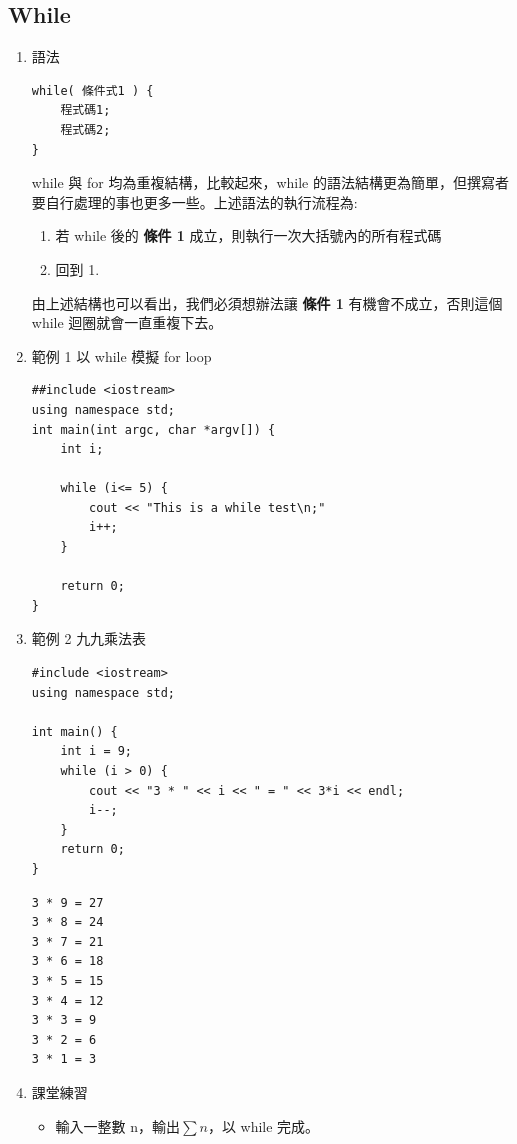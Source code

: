 \documentclass[a4paper,12pt]{article}
\begin{document}
\subsection{While}
\label{sec:org6940792}
\begin{enumerate}
\item 語法
\label{sec:org4c6519b}
\lstset{breaklines=true,language=cpp,label= ,caption= ,captionpos=b,firstnumber=1,numbers=left}
\begin{lstlisting}
while( 條件式1 ) {
    程式碼1;
    程式碼2;
}
\end{lstlisting}
while 與 for 均為重複結構，比較起來，while 的語法結構更為簡單，但撰寫者要自行處理的事也更多一些。上述語法的執行流程為:\\
\begin{enumerate}
\item 若 while 後的 \textbf{條件 1} 成立，則執行一次大括號內的所有程式碼\\
\item 回到 1.\\
\end{enumerate}
由上述結構也可以看出，我們必須想辦法讓 \textbf{條件 1} 有機會不成立，否則這個 while 迴圈就會一直重複下去。\\
\item 範例 1
\label{sec:org573c1be}
以 while 模擬 for loop\\
\lstset{breaklines=true,language=cpp,label= ,caption= ,captionpos=b,firstnumber=1,numbers=left}
\begin{lstlisting}
##include <iostream>
using namespace std;
int main(int argc, char *argv[]) {
    int i;

    while (i<= 5) {
        cout << "This is a while test\n;"
        i++;
    }

    return 0;
}
\end{lstlisting}

\item 範例 2
\label{sec:org74e1082}
九九乘法表\\
\lstset{breaklines=true,language=cpp,label= ,caption= ,captionpos=b,firstnumber=1,numbers=left}
\begin{lstlisting}
#include <iostream>
using namespace std;

int main() {
    int i = 9;
    while (i > 0) {
        cout << "3 * " << i << " = " << 3*i << endl;
        i--;
    }
    return 0;
}
\end{lstlisting}

\begin{verbatim}
3 * 9 = 27
3 * 8 = 24
3 * 7 = 21
3 * 6 = 18
3 * 5 = 15
3 * 4 = 12
3 * 3 = 9
3 * 2 = 6
3 * 1 = 3
\end{verbatim}
\item 課堂練習
\label{sec:orgb34f6af}
\begin{itemize}
\item 輸入一整數 n，輸出\(\sum{n}\)，以 while 完成。\\
\end{itemize}
\end{enumerate}
\end{document}

